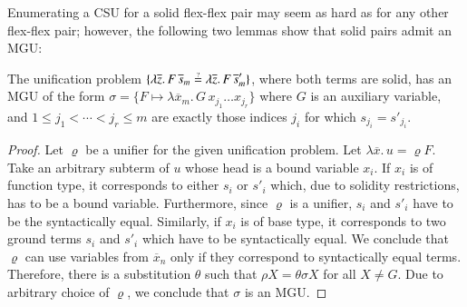 Enumerating a CSU for a solid flex-flex pair may seem as hard as 
for any other flex-flex pair; however,
the following two lemmas show that solid pairs admit an MGU:

\begin{lemma}
    \label{unif:lemma:solid-var-same-mgu}
    The unification problem 
    $\{\lambda \overline{z}.\, F\,\overline{s}_m \unif   \lambda \overline{z}.\, F\,\overline{s}'_{m}\}$, where both terms are
    solid, has an MGU of the form $\sigma=\{F \mapsto \lambda \overline{x}_m.\,
    G \, x_{j_1} \ldots x_{j_r}\}$ where $G$ is an auxiliary variable, and $1 \leq
    j_1 < \cdots < j_r \leq m$ are exactly those indices $j_i$ for which
    $s_{j_i} = s'_{j_i}$.
\end{lemma}
\begin{proof}
    Let $\varrho$ be a unifier for the given unification problem.
    Let $\lambda \overline{x}.\, u = \varrho F$. Take an arbitrary subterm of $u$ whose head is a bound
    variable $x_i$. If $x_i$ is of function type, it corresponds to either $s_i$
    or $s'_i$ which, due to solidity restrictions, has to be a bound variable.
    Furthermore, since $\varrho$ is a unifier, $s_i$ and $s'_i$ have to be the
    syntactically equal. Similarly, if $x_i$ is of base type, it corresponds
    to two ground terms $s_i$ and $s'_i$ which have to be syntactically equal.
    We conclude that $\varrho$ can use variables from $\overline{x}_n$ only
    if they correspond to syntactically equal terms. Therefore, 
    there is a substitution $\theta$ such that $\rho X = \theta\sigma X$ for all $X \not = G$. 
    Due to arbitrary choice of $\varrho$, we conclude that $\sigma$ is an MGU.
\end{proof}


